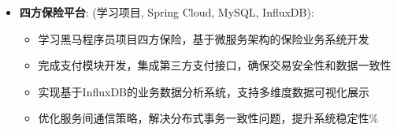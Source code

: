 \documentclass[zh]{resume}
\begin{document}
\begin{itemize}
  \item \textbf{四方保险平台}:
    (学习项目, Spring Cloud, MySQL, InfluxDB):
    \begin{itemize}
      \item 学习黑马程序员项目四方保险，基于微服务架构的保险业务系统开发
      \item 完成支付模块开发，集成第三方支付接口，确保交易安全性和数据一致性
      \item 实现基于InfluxDB的业务数据分析系统，支持多维度数据可视化展示
      \item 优化服务间通信策略，解决分布式事务一致性问题，提升系统稳定性\%
    \end{itemize}
\end{itemize}
\end{document}
